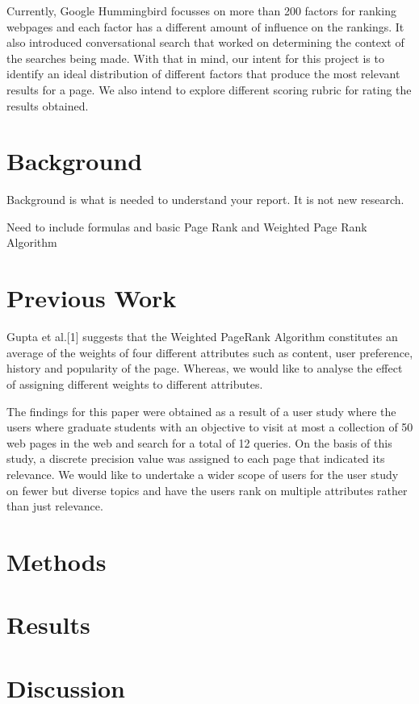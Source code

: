 \documentclass[conference]{IEEEtran}
\begin{document}
Currently, Google Hummingbird focusses on more than 200 factors for ranking webpages and each factor has a different amount of influence on the rankings. It also introduced conversational search that worked on determining the context of the searches being made. With that in mind, our intent for this project is to identify an ideal distribution of different factors that produce the most relevant results for a page. We also intend to explore different scoring rubric for rating the results obtained.

\section{Background}
Background is what is needed to understand your report. It is not new research.

Need to include formulas and basic Page Rank and Weighted Page Rank Algorithm

\section{Previous Work}
Gupta et al.[1] suggests that the Weighted PageRank Algorithm constitutes an average of the weights of four different attributes such as content, user preference, history and popularity of the page. Whereas, we would like to analyse the effect of assigning different weights to different attributes.

The findings for this paper were obtained as a result of a user study where the users where graduate students with an objective to visit at most a collection of 50 web pages in the web and search for a total of 12 queries. On the basis of this study, a discrete precision value was assigned to each page that indicated its relevance. We would like to undertake a wider scope of users for the user study on fewer but diverse topics and have the users rank on multiple attributes rather than just relevance.

\section{Methods}
\blindtext

\section{Results}
\blindtext

\section{Discussion}
\blindtext
\end{document}
